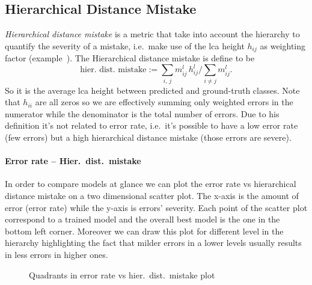 \subsection{Hierarchical Distance Mistake}
\label{subsec:hierarchical-distance-mistake}
\emph{Hierarchical distance mistake} is a metric that take into account the hierarchy to quantify the severity of a mistake, i.e.\ make use of the \acrshort{lca} height $h_{ij}$ as weighting factor (example~).
The Hierarchical distance mistake is define to be
\begin{equation}
  \textrm{hier.\ dist.\ mistake} :=
  \sum_{i, \, j} m_{ij}^l \, h_{ij}^l \bigg/ \sum_{i \ne j} m_{ij}^l.
  \label{eq:hierarchical-distance-mistake}
\end{equation}
So it is the average \acrshort{lca} height between predicted and ground-truth classes.
Note that $h_{ii}$ are all zeros so we are effectively summing only weighted errors in the numerator while the denominator is the total number of errors. Due to his definition it's not related to error rate, i.e.\ it's possible to have a low error rate (few errors) but a high hierarchical distance mistake (those errors are severe).

\paragraph{Error rate -- Hier.\ dist.\ mistake}
\label{par:error-rate-hier-dist-mistake}
In order to compare models at glance we can plot the error rate vs hierarchical distance mistake on a two dimensional scatter plot.
The x-axis is the amount of error (error rate) while the y-axis is errors' severity. Each point of the scatter plot correspond to a trained model and the overall best model is the one in the bottom left corner.
Moreover we can draw this plot for different level in the hierarchy highlighting the fact that milder errors in a lower levels usually results in less errors in higher ones.
\begin{figure}[htbp]
  \caption{Quadrants in error rate vs hier.\ dist.\ mistake plot}
  \label{fig:04/error-rate-hier-dist-mistake}
\end{figure}

